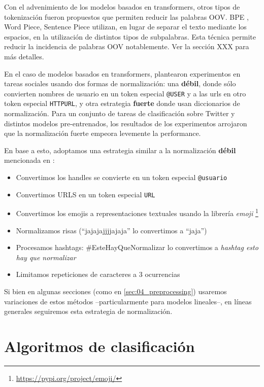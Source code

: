 Con el advenimiento de los modelos basados en transformers, otros tipos de tokenización fueron propuestos que permiten reducir las palabras OOV. BPE \cite{sennrich2016neural}, Word Piece, Sentence Piece \cite{kudo-richardson-2018-sentencepiece} utilizan, en lugar de separar el texto mediante los espacios, en la utilización de distintos tipos de subpalabras. Esta técnica permite reducir la incidencia de palabras OOV notablemente. Ver la sección XXX para más detalles. 

En el caso de modelos basados en transformers, \citet{bertweet} plantearon experimentos en tareas sociales usando dos formas de normalización: una \textbf{débil}, donde sólo convierten nombres de usuario en un token especial \verb|@USER| y a las urls en otro token especial \verb|HTTPURL|, y otra estrategia \textbf{fuerte} donde usan diccionarios de normalización. Para un conjunto de tareas de clasificación sobre Twitter y distintos modelos pre-entrenados, los resultados de los experimentos arrojaron que la normalización fuerte empeora levemente la performance.

En base a esto, adoptamos una estrategia similar a la normalización \textbf{débil} mencionada en \citet{bertweet}:

\begin{itemize}
    \item  Convertimos los handles se convierte en un token especial \verb|@usuario|
    \item Convertimos URLS en un token especial \verb|URL|
    \item Convertimos los emojis a representaciones textuales usando la librería \emph{emoji} \footnote{\url{https://pypi.org/project/emoji/}}
    \item Normalizamos risas (``jajajajjjjajaja'' lo convertimos a ``jaja'')
    \item Procesamos hashtags: \#EsteHayQueNormalizar lo convertimos a \emph{hashtag esto hay que normalizar}
    \item Limitamos repeticiones de caracteres a 3 ocurrencias
\end{itemize}

Si bien en algunas secciones (como en \ref{sec:04_preprocessing}) usaremos variaciones de estos métodos --particularmente para modelos lineales--, en líneas generales seguiremos esta estrategia de normalización.

\section{Algoritmos de clasificación}

